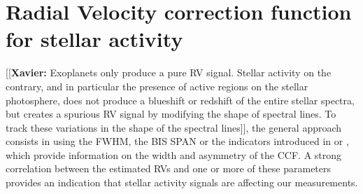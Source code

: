 \documentclass[11pt, oneside]{article}
\newcommand{\xavier}[1]{{\color{blue}[[\textbf{Xavier: }#1]]}}
\begin{document}
\section{Radial Velocity correction function for stellar activity} \label{sec:31}

\xavier{Exoplanets only produce a pure RV signal. Stellar activity on the contrary, and in particular the presence of active regions on the stellar photosphere, does not produce a blueshift or redshift of the entire stellar spectra, but creates a spurious RV signal by modifying the shape of spectral lines. To track these variations in the shape of the spectral lines}, the general approach consists in using the FWHM, the BIS SPAN or the indicators introduced in \citet{Boisse-2011} or \citet{Figueira-2013}, which provide information on the width and asymmetry of the CCF. A strong correlation between the estimated RVs and one or more of these parameters provides an indication that stellar activity signals are affecting our measurements.
\end{document}
